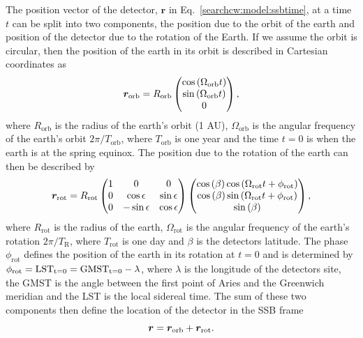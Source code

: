 The position vector of the detector,
$\bm{r}$ in Eq.~\ref{searchcw:model:ssbtime}, at a time $t$ can be split into two components,
the position due to the orbit of the earth and position of the detector due to the rotation of
the Earth.
If we assume the orbit is circular, then the position of the earth in its orbit
is described in Cartesian coordinates as
%
\begin{equation}
    \bm{r}_{\rm{orb}} = R_{\mathrm{orb}}
    \left(
    \begin{matrix}
        \cos{\left( \Omega_{\mathrm{orb}} t   \right)}  \\
        \sin{\left( \Omega_{\mathrm{orb}} t   \right)} \\
        0 \\
    \end{matrix} \right),
\end{equation}
%
where $R_{\mathrm{orb}}$ is the radius of the earth's orbit (1 AU),
$\Omega_{\mathrm{orb}}$ is the angular frequency of the earth's orbit
$2\pi/T_{\mathrm{orb}}$, where $T_{\mathrm{orb}}$ is one year and the time $t=0$ is when the earth is at the spring equinox.  The
position due to the rotation of the earth can then be described by 
%
\begin{equation}
    \bm{r}_{\rm{rot}} = R_{\mathrm{rot}}
    \left(
    \begin{matrix}
        1 & 0 & 0  \\
        0 & \cos \epsilon & \sin \epsilon \\
        0 & -\sin \epsilon & \cos \epsilon \\
    \end{matrix} \right)
    \left(
    \begin{matrix}
        \cos{(\beta)}\cos{\left( \Omega_{\mathrm{rot}} t + \phi_{\mathrm{rot}}  \right)}  \\
        \cos{(\beta)}\sin{\left( \Omega_{\mathrm{rot}} t + \phi_{\mathrm{rot}}  \right)} \\
        \sin{(\beta)} \\
    \end{matrix} \right),
\end{equation}
%
where $R_{\mathrm{rot}}$ is the radius of the earth, $\Omega_{\mathrm{rot}}$ is the
angular frequency of the earth's rotation $2\pi/T_{\mathrm{R}}$, where
$T_{\mathrm{rot}}$ is one day and $\beta$ is the detectors latitude. The phase $\phi_{\mathrm{rot}}$ defines the position of the earth in its rotation at $t=0$ and is determined by $\phi_{\mathrm{rot}} = \rm{LST}_{t=0} = \rm{GMST}_{t=0} - \lambda$, where $\lambda$  is the longitude of
the detectors site, the \gls{GMST} is the angle between the first point of Aries and the Greenwich meridian and the LST is the local sidereal time. The sum of these two components
then define the location of the detector in the \gls{SSB} frame
%
\begin{equation}
    \bm{r} = \bm{r}_{\rm{orb}} + \bm{r}_{\rm{rot}}.
\end{equation}

